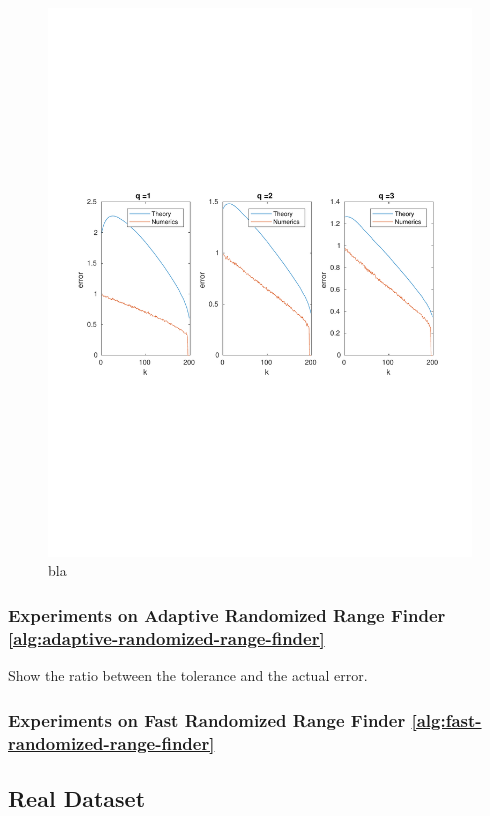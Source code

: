 \begin{figure}[ht]
\begin{center}
\includegraphics[width=\textwidth]{figures/1-5.pdf}
\end{center}
\caption{bla}
\end{figure}

\subsubsection{Experiments on Adaptive Randomized Range Finder
\ref{alg:adaptive-randomized-range-finder}}

Show the ratio between the tolerance and the actual error.

\subsubsection{Experiments on Fast Randomized Range Finder
\ref{alg:fast-randomized-range-finder}}
\label{sec:gaussian-matrices}
\subsection{Real Dataset}